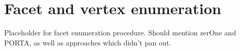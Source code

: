 \section{Facet and vertex enumeration}
\label{app:facets}
Placeholder for facet enumeration procedure. Should mention zerOne and PORTA, as well as approaches which didn't pan out.
